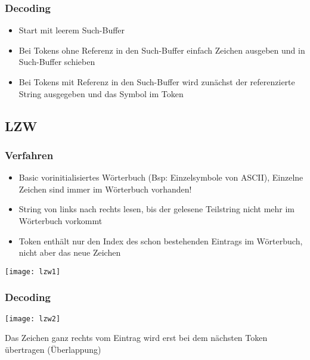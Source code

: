 \subsubsection{Decoding}
\begin{itemize}
	\item Start mit leerem Such-Buffer
	\item Bei Tokens ohne Referenz in den Such-Buffer einfach Zeichen ausgeben und in Such-Buffer schieben
	\item Bei Tokens mit Referenz in den Such-Buffer wird zunächst der referenzierte String ausgegeben und das Symbol im Token
\end{itemize}

\subsection{LZW}
\subsubsection{Verfahren}
\begin{itemize}
	\item Basic vorinitialisiertes Wörterbuch (Bsp: Einzelsymbole von ASCII), Einzelne Zeichen sind immer im Wörterbuch vorhanden!
	\item String von links nach rechts lesen, bis der gelesene Teilstring nicht mehr im Wörterbuch vorkommt
	\item Token enthält nur den Index des schon bestehenden Eintrags im Wörterbuch, nicht aber das neue Zeichen
\end{itemize}
\begin{center}
	\texttt{[image: lzw1]}
\end{center}
\subsubsection{Decoding}
\begin{center}
	\texttt{[image: lzw2]}
\end{center}
Das Zeichen ganz rechts vom Eintrag wird erst bei dem
nächsten Token übertragen (Überlappung)